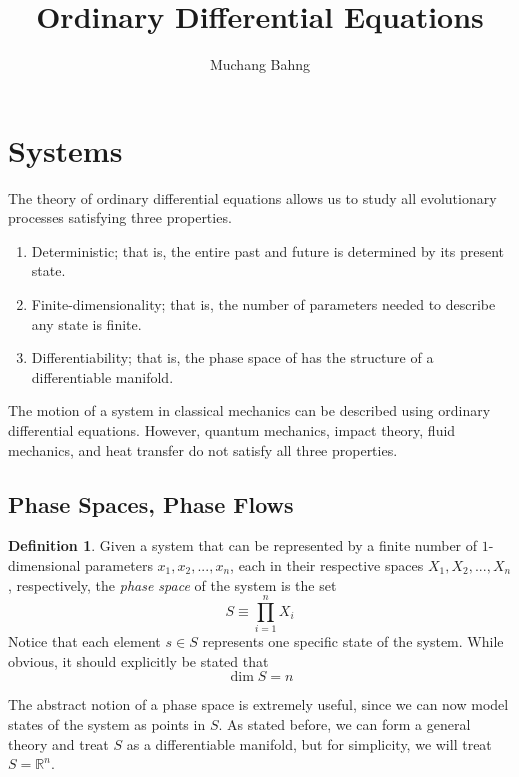 \documentclass{article}
\theoremstyle{remark}
\theoremstyle{definition}
\newtheorem{definition}{Definition}[section]
\begin{document}
\pagestyle{fancy}

\cfoot{\thepage / \pageref{LastPage}}

\title{Ordinary Differential Equations}
\author{Muchang Bahng}

\maketitle
\tableofcontents
\pagebreak 

\section{Systems}
The theory of ordinary differential equations allows us to study all evolutionary processes satisfying three properties. 
\begin{enumerate}
    \item Deterministic; that is, the entire past and future is determined by its present state. 
    \item Finite-dimensionality; that is, the number of parameters needed to describe any state is finite. 
    \item Differentiability; that is, the phase space of has the structure of a differentiable manifold. 
\end{enumerate}
The motion of a system in classical mechanics can be described using ordinary differential equations. However, quantum mechanics, impact theory, fluid mechanics, and heat transfer do not satisfy all three properties. 

\subsection{Phase Spaces, Phase Flows}

\begin{definition}
Given a system that can be represented by a finite number of $1$-dimensional parameters $x_1, x_2, ..., x_n$, each in their respective spaces $X_1, X_2, ..., X_n$, respectively, the \textit{phase space} of the system is the set
\[S \equiv \prod_{i=1}^n X_i\]
Notice that each element $s \in S$ represents one specific state of the system. While obvious, it should explicitly be stated that 
\[\dim{S} = n\]
\end{definition}

The abstract notion of a phase space is extremely useful, since we can now model states of the system as points in $S$. As stated before, we can form a general theory and treat $S$ as a differentiable manifold, but for simplicity, we will treat $S = \mathbb{R}^n$. 
\end{document}

